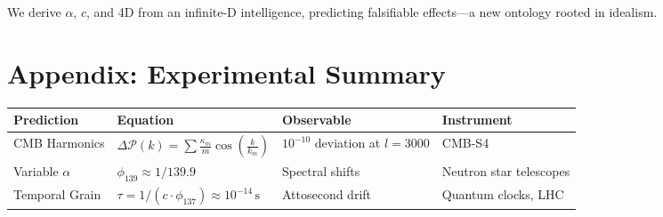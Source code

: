 \documentclass[12pt]{article}
\begin{document}
We derive \(\alpha\), \(c\), and 4D from an infinite-D intelligence, predicting falsifiable effects—a new ontology rooted in idealism.

\section*{Appendix: Experimental Summary}
\begin{tabularx}{\textwidth}{|l|X|l|l|}
\hline
\textbf{Prediction} & \textbf{Equation} & \textbf{Observable} & \textbf{Instrument} \\
\hline
CMB Harmonics & \(\Delta \mathcal{P}(k) = \sum \frac{\kappa_m}{m} \cos\left(\frac{k}{k_m}\right)\) & \(10^{-10}\) deviation at \(l = 3000\) & CMB-S4 \\
\hline
Variable \(\alpha\) & \(\phi_{139} \approx 1/139.9\) & Spectral shifts & Neutron star telescopes \\
\hline
Temporal Grain & \(\tau = 1/(c \cdot \phi_{137}) \approx 10^{-14} \, \text{s}\) & Attosecond drift & Quantum clocks, LHC \\
\hline
\end{tabularx}
\end{document}

